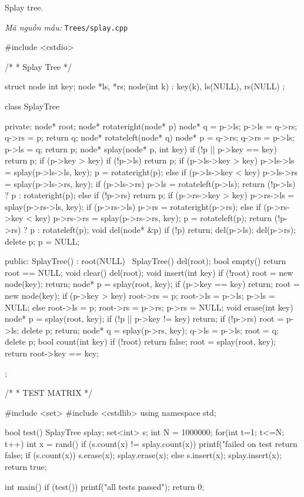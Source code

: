 \documentclass[11pt]{article}
\newcommand{\codepath}[1]{\par\noindent\textit{Mã nguồn mẫu:} \texttt{#1}\par}
\begin{document}
Splay tree.

\codepath{Trees/splay.cpp}

\begingroup\scriptsize
\begin{vncode}
#include <cstdio>

/*
 * Splay Tree
 */

struct node {
	int key;
	node *ls, *rs;
	node(int k) : key(k), ls(NULL), rs(NULL) {}
};

class SplayTree {
private:
	node* root;
	node* rotateright(node* p) {
		node* q = p->ls;
		p->ls = q->rs;
		q->rs = p;
		return q;
	}
	node* rotateleft(node* q) {
		node* p = q->rs;
		q->rs = p->ls;
		p->ls = q;
		return p;
	}
	node* splay(node* p, int key) {
		if (!p || p->key == key) return p;
		if (p->key > key) {
			if (!p->ls) return p;
			if (p->ls->key > key)	{
				p->ls->ls = splay(p->ls->ls, key);
				p = rotateright(p);
			}
			else if (p->ls->key < key) {
				p->ls->rs = splay(p->ls->rs, key);
				if (p->ls->rs)
					p->ls = rotateleft(p->ls);
			}
			return (!p->ls) ? p : rotateright(p);
		}
		else {
			if (!p->rs) return p;
			if (p->rs->key > key) {
				p->rs->ls = splay(p->rs->ls, key);
				if (p->rs->ls)
					p->rs = rotateright(p->rs);
			}
			else if (p->rs->key < key) {
				p->rs->rs = splay(p->rs->rs, key);
				p = rotateleft(p);
			}
			return (!p->rs) ? p : rotateleft(p);
		}
	}
	void del(node* &p) {
		if (!p) return;
		del(p->ls); del(p->rs);
		delete p;
		p = NULL;
	}

public:
	SplayTree() : root(NULL) { }
	~SplayTree() { del(root); }
	bool empty() { return root == NULL; }
	void clear() { del(root); }
	void insert(int key) {
		if (!root) {
			root = new node(key);
			return;
		}
		node* p = splay(root, key);
		if (p->key == key) return;
		root = new node(key);
		if (p->key > key) {
			root->rs = p;
			root->ls = p->ls;
			p->ls = NULL;
		}
		else {
			root->ls = p;
			root->rs = p->rs;
			p->rs = NULL;
		}
	}
	void erase(int key) {
		node* p = splay(root, key);
		if (!p || p->key != key) return;
		if (!p->rs) {
			root = p->ls;
			delete p;
			return;
		}
		node* q = splay(p->rs, key);
		q->ls = p->ls;
		root = q;
		delete p;
	}
	bool count(int key) {
		if (!root) return false;
		root = splay(root, key);
		return root->key == key;
	}
};

/*
 * TEST MATRIX
 */

#include <set>
#include <cstdlib>
using namespace std;

bool test()
{
	SplayTree splay;
	set<int> s;
	int N = 1000000;
	for(int t=1; t<=N; t++) {
		int x = rand()%
		if (s.count(x) != splay.count(x)) {
			printf("failed on test %
			return false;
		}
		if (s.count(x)) {
			s.erase(x);
			splay.erase(x);
		}
		else{
			s.insert(x);
			splay.insert(x);
		}
	}
	return true;
}

int main()
{
	if (test()) {
		printf("all tests passed\n");
	}
	return 0;
}
\end{vncode}
\endgroup
\end{document}
